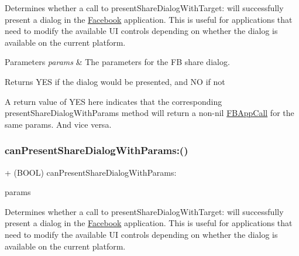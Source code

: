 Determines whether a call to present\+Share\+Dialog\+With\+Target\+: will successfully present a dialog in the \hyperlink{interfaceFacebook}{Facebook} application. This is useful for applications that need to modify the available UI controls depending on whether the dialog is available on the current platform.


\begin{DoxyParams}{Parameters}
{\em params} & The parameters for the FB share dialog.\\
\hline
\end{DoxyParams}
\begin{DoxyReturn}{Returns}
Y\+ES if the dialog would be presented, and NO if not
\end{DoxyReturn}
A return value of Y\+ES here indicates that the corresponding present\+Share\+Dialog\+With\+Params method will return a non-\/nil \hyperlink{interfaceFBAppCall}{F\+B\+App\+Call} for the same params. And vice versa. \mbox{\label{interfaceFBDialogs_a36e9e390bb8c6040e6027b647ed587e8}} 
\subsubsection{\texorpdfstring{can\+Present\+Share\+Dialog\+With\+Params\+:()}{canPresentShareDialogWithParams:()}\hspace{0.1cm}{\footnotesize\ttfamily [3/5]}}
{\footnotesize\ttfamily + (B\+O\+OL) can\+Present\+Share\+Dialog\+With\+Params\+: \begin{DoxyParamCaption}\item[{(\hyperlink{interfaceFBLinkShareParams}{F\+B\+Link\+Share\+Params} $\ast$)}]{params }\end{DoxyParamCaption}}

Determines whether a call to present\+Share\+Dialog\+With\+Target\+: will successfully present a dialog in the \hyperlink{interfaceFacebook}{Facebook} application. This is useful for applications that need to modify the available UI controls depending on whether the dialog is available on the current platform.


